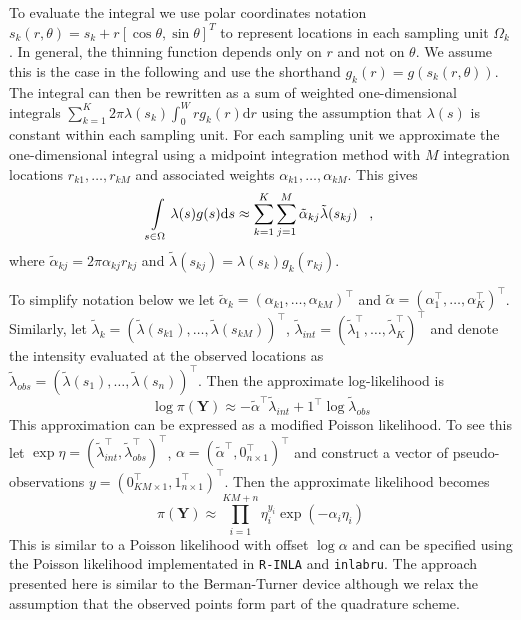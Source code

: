 \documentclass[preprint,12pt]{elsarticle}
\newcommand{\bm}{\boldsymbol}  %
\newcommand{\tl}{\tilde{\lambda}}   %
\begin{document}
To evaluate the integral we use polar coordinates notation $s_k(r, \theta) = s_k + r\left[\cos\theta, \sin\theta \right]^T$ to represent locations in each sampling unit $\Omega_k$.   In general, the thinning function depends only on $r$ and not on $\theta$.  We assume this is the case in the following and use the shorthand $g_k(r) = g(s_k(r, \theta))$. The integral can then be rewritten as a sum of weighted one-dimensional integrals $\sum_{k=1}^K 2\pi \lambda(s_k) \int_0^W r g_k(r)\mathrm{d}r$ using the assumption that $\lambda(s)$ is constant within each sampling unit.  For each sampling unit we approximate the one-dimensional integral using a midpoint integration method with $M$ integration locations $r_{k1}, \ldots, r_{kM}$ and associated weights $\alpha_{k1}, \ldots, \alpha_{kM}$.  This gives
\begin{equation*}
	\int\displaylimits_{s \in \Omega} \lambda(s)g(s)\mathrm{d}s \approx \sum_{k=1}^K \sum_{j=1}^M \tilde{\alpha}_{kj} \tl(s_{kj}) \;\;\; ,
\end{equation*}
where $\tilde{\alpha}_{kj} = 2\pi \alpha_{kj}r_{kj}$ and $\tl(s_{kj}) = \lambda(s_k) g_k(r_{kj})$.

To simplify notation below we let $\tilde{\alpha}_{k} = (\alpha_{k1}, \ldots, \alpha_{kM})^\intercal$ and $\tilde{\alpha} = (\alpha_1^\intercal, \ldots, \alpha_K^\intercal)^\intercal$.  Similarly, let $\tl_k = (\tl(s_{k1}), \ldots, \tl(s_{kM}))^\intercal$, $\tl_{int} = (\tl_1^\intercal, \ldots, \tl_K^\intercal)^\intercal$ and denote the intensity evaluated at the observed locations as $\tl_{obs} = (\tl(s_1), \ldots, \tl(s_n))^\intercal$.  Then the approximate log-likelihood is
\begin{equation}
\label{approx-log-likelihood}
	\log \pi(\bm{Y}) \approx - \tilde{\alpha}^\intercal \tl_{int} + 1^\intercal\log\tl_{obs}
\end{equation}
This approximation can be expressed as a modified Poisson likelihood.  To see this let $\exp \eta = (\tl_{int}^\intercal, \tl_{obs}^\intercal)^\intercal$,
$\alpha = (\tilde{\alpha}^\intercal, 0_{n \times 1}^\intercal)^\intercal$ and construct a vector of pseudo-observations $y = (0_{KM\times 1}^\intercal, 1_{n \times 1}^\intercal)^\intercal$.  Then the approximate likelihood becomes
\begin{equation}
\pi(\bm{Y}) \approx \prod_{i=1}^{KM + n} \eta_i^{y_i}\exp(-\alpha_i\eta_i)
\end{equation}
This is similar to a Poisson likelihood with offset $\log\alpha$ and can be specified using the Poisson likelihood implementated in \texttt{R-INLA} and \texttt{inlabru}.  The approach presented here is similar to the Berman-Turner device \citep{berman_approximating_1992, baddeley_practical_2000} although we relax the assumption that the observed points form part of the quadrature scheme.
\end{document}
